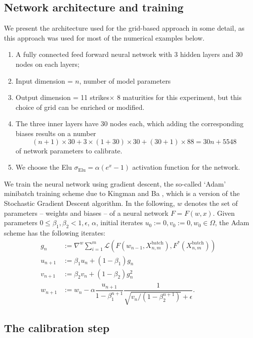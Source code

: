 \documentclass{article}
\theoremstyle{remark}
\begin{document}
\subsection{Network architecture and training}

\label{sec:architecture}
We present the architecture used for the grid-based approach in some detail,
as this approach was used for most of the numerical examples below.
\begin{enumerate}
\item A fully connected feed forward neural network with 3 hidden layers
  and $30$ nodes on each layers;
\item Input dimension = $n$, number of  model parameters
\item Output dimension = 11 strikes$\times$ 8 maturities for this experiment, but this choice of grid can be enriched or modified.
\item The three inner layers have $30$ nodes each, which adding the
  corresponding biases results on a number $$(n+1)\times30+ 3\times
  (1+30)\times 30+(30+1)\times88=30 n+5548$$ of network parameters to
  calibrate.
\item We choose the Elu $\sigma_{\mathrm{Elu}}=\alpha(e^x-1)$ activation
  function for the network.
\end{enumerate}

We train the neural network using gradient descent, the so-called `Adam'
minibatch training scheme due to Kingman and Ba \cite{KBAdam}, which is a
version of the Stochastic Gradient Descent algorithm. In the following, $w$ denotes the set of parameters --
weights and biases -- of a neural network $F = F(w,x)$.  Given parameters
$0 \leq \beta_{1}, \beta_{2} < 1, \epsilon$, $\alpha$, initial iterates
$u_{0} := 0, v_{0} := 0, w_{0}\in\Omega$, the Adam scheme has the following
iterates:
\begin{align*}
  g_{n} &  := \nabla^{w} \sum_{i = 1}^{m}
          \mathcal{L}\left(F(w_{n-1},X_{n,m}^{\text{batch}}),F^*(X_{n,m}^{\text{batch}})\right)\\ 
  u_{n+1} & := \beta_{1} u_{n} + (1 - \beta_{1})g_{n} \\
  v_{n+1} & := \beta_{2} v_{n} + (1 - \beta_{2}) g_{n}^{2} \\
  w_{n+1} & := w_{n} - \alpha \dfrac{u_{n+1}}{1 - \beta_{1}^{n+1}} \dfrac{1}{\sqrt{v_{n} / (1 - \beta_{2}^{n+1})} + \epsilon}.
\end{align*}

\subsection{The calibration step}
\label{sec:calibrationStep}
\end{document}
